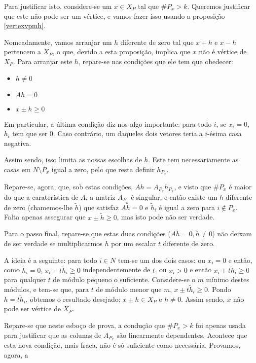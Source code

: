 \documentclass{article}
\theoremstyle{definition}
\begin{document}
	Para justificar isto, considere-se um $x \in X_P$ tal que $\# P_x > k$. Queremos justificar que este não pode ser um vértice, e vamos fazer isso usando a proposição \ref{vertexvpmh}.
	
	Nomeadamente, vamos arranjar um $h$ diferente de zero tal que $x+h$ e $x-h$ pertencem a $X_P$, o que, devido a esta proposição, implica que $x$ não é vértice de $X_P$. Para arranjar este $h$, repare-se nas condições que ele tem que obedecer:
	
	\begin{itemize}
	\item $h \neq 0$
	\item $Ah = 0$
	\item $x \pm h \geq 0$
	\end{itemize}
	
	Em particular, a última condição diz-nos algo importante: para todo $i$, se $x_i = 0$, $h_i$ tem que ser $0$. Caso contrário, um daqueles dois vetores teria a $i$-ésima casa negativa.
	
	Assim sendo, isso limita as nossas escolhas de $h$. Este tem necessariamente as casas em $N \setminus P_x$ igual a zero, pelo que resta definir $h_{P_x}$.
	
	Repare-se, agora, que, sob estas condições, $Ah = A_{P_x} h_{P_x}$, e visto que $\# P_x$ é maior do que a caraterística de $A$, a matriz $A_{P_x}$ é singular, e então existe um $h$ diferente de zero (chamemos-lhe $\tilde h$) que satisfaz $A \tilde h = 0$ e $\tilde h_i$ é igual a zero para $i \not \in P_x$. Falta apenas assegurar que $x \pm \tilde h \geq 0$, mas isto pode não ser verdade.
	
	Para o passo final, repare-se que estas duas condições ($A \tilde h = 0, \tilde h \neq 0$) não deixam de ser verdade se multiplicarmos $\tilde h$ por um escalar $t$ diferente de zero.
	
	A ideia é a seguinte: para todo $i \in N$ tem-se um dos dois casos: ou $x_i = 0$ e então, como $\tilde h_i = 0$, $x_i + t \tilde h_i \geq 0$ independentemente de $t$, ou $x_i > 0$ e então $x_i + t \tilde h_i \geq 0$ para qualquer $t$ de módulo pequeno o suficiente. Considere-se o $m$ mínimo destes módulos, e tem-se que, para $t$ de módulo menor que $m$, $x \pm t \tilde h_i \geq 0$. Pondo $h = t \tilde h_i$, obtemos o resultado desejado: $x \pm h \in X_P$ e $h \neq 0$. Assim sendo, $x$ não pode ser vértice de $X_P$.
	
	Repare-se que neste esboço de prova, a condução que $\#P_x > k$ foi apenas usada para justificar que as colunas de $A_{P_x}$ são linearmente dependentes. Acontece que esta nova condição, mais fraca, não é só suficiente como necessária. Provamos, agora, a
	
\end{document}

